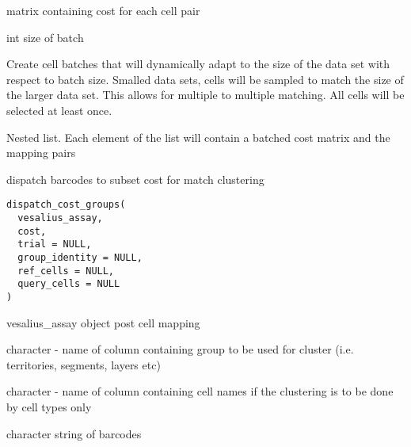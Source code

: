 \documentclass[a4paper]{book}
\begin{document}
%
\begin{Arguments}
\begin{ldescription}
\item[\code{cost\_matrix}] matrix containing cost for each cell pair

\item[\code{batch\_size}] int size of batch
\end{ldescription}
\end{Arguments}
%
\begin{Details}
Create cell batches that will dynamically adapt to the size of
the data set with respect to batch size. Smalled data sets, cells
will be sampled to match the size of the larger data set. This
allows for multiple to multiple matching. All cells will be selected
at least once.
\end{Details}
%
\begin{Value}
Nested list. Each element of the list will contain 
a batched cost matrix and the mapping pairs
\end{Value}
%
\begin{Description}
dispatch barcodes to subset cost for match clustering
\end{Description}
%
\begin{Usage}
\begin{verbatim}
dispatch_cost_groups(
  vesalius_assay,
  cost,
  trial = NULL,
  group_identity = NULL,
  ref_cells = NULL,
  query_cells = NULL
)
\end{verbatim}
\end{Usage}
%
\begin{Arguments}
\begin{ldescription}
\item[\code{vesalius\_assay}] vesalius\_assay object post cell mapping

\item[\code{group\_identity}] character - name of column containing group
to be used for cluster (i.e. territories, segments, layers etc)

\item[\code{cell\_label}] character - name of column containing cell names
if the clustering is to be done by cell types only
\end{ldescription}
\end{Arguments}
%
\begin{Value}
character string of barcodes
\end{Value}
\end{document}
